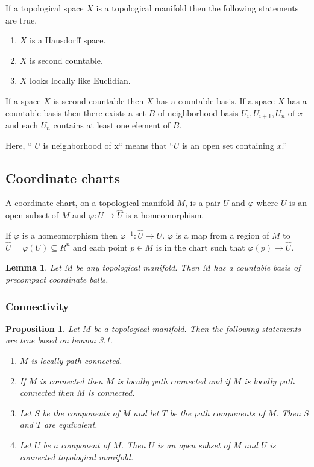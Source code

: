 \documentclass{article}
\newtheorem{proposition}[theorem]{Proposition}
\newtheorem{lemma}[theorem]{Lemma}
\begin{document}
If a topological space $ X $ is a topological manifold then the following statements are true.

\begin{enumerate}
\item $ X $ is a Hausdorff space.
\item $ X $ is second countable.
\item $ X $ looks locally like Euclidian.
\end{enumerate}

If a space $ X $ is second countable then $ X $ has a countable basis. If a space $ X $ has a countable basis then there exists a set $ B $ of neighborhood basis $ U_{i}, U_{i+1}, U_{n} $ of $ x $ and each $ U_{n} $ contains at least one element of $ B $.

Here, `` $ U $ is neighborhood of x`` means that ``$ U $ is an open set containing $ x $.''

\subsection{Coordinate charts}
A coordinate chart, on a topological manifold $ M $, is a pair $ U $ and $ \varphi $ where $ U $ is an open subset of $ M $ and $ \varphi: U \rightarrow \hat{U} $ is a homeomorphism.

If $ \varphi $ is a homeomorphism then $  \varphi^{-1}: \hat{U} \rightarrow U $. $ \varphi $ is a map from a region of $ M $ to  $ \hat{U} = \varphi(U) \subseteq R^n $ and each point $ p \in M $ is in the chart such that $ \varphi(p) \rightarrow \hat{U} $.

\begin{lemma}
Let $ M $ be any topological manifold. Then $ M $ has a countable basis of precompact coordinate balls.
\end{lemma}

\subsubsection{Connectivity}
\begin{proposition}
  Let $ M $ be a topological manifold.  Then the following statements are true based on lemma 3.1.
  \begin{enumerate}
  \item $ M $ is locally path connected.
  \item If $ M $ is connected then $ M $ is locally path connected and if $ M $ is locally path connected then $ M $ is connected.
  \item Let $ S $ be the components of $ M $ and let $ T $ be the path components of $ M $. Then $ S $ and $ T $ are equivalent.
  \item Let $ U $ be a component of $ M $. Then $ U $ is an open subset of $ M $ and $ U $ is connected topological manifold.
  \end{enumerate}
\end{proposition}
\end{document}

